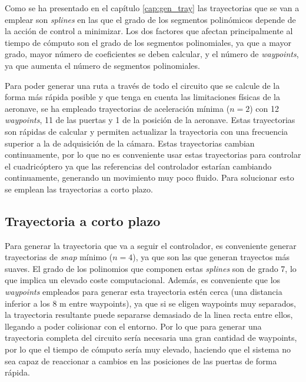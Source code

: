 Como se ha presentado en el capítulo \ref{cap:gen_tray} las trayectorias que se van a emplear son \textit{splines} en las que el grado de los segmentos polinómicos depende de la acción de control a minimizar. Los dos factores que afectan principalmente al tiempo de cómputo son el grado de los segmentos polinomiales, ya que a mayor grado, mayor número de coeficientes se deben calcular, y el número de \textit{waypoints}, ya que aumenta el número de segmentos polinomiales.

Para poder generar una ruta a través de todo el circuito que se calcule de la forma más rápida posible y que tenga en cuenta las limitaciones físicas de la aeronave, se ha empleado trayectorias de aceleración mínima ($n = 2$) con 12 \textit{waypoints}, 11 de las puertas y 1 de la posición de la aeronave. Estas trayectorias son rápidas de calcular y permiten actualizar la trayectoria con una frecuencia superior a la de adquisición de la cámara. Estas trayectorias cambian continuamente, por lo que no es conveniente usar estas trayectorias para controlar el cuadricóptero ya que las referencias del controlador estarían cambiando continuamente, generando un movimiento muy poco fluido. Para solucionar esto se emplean las trayectorias a corto plazo.

\subsection{Trayectoria a corto plazo}

Para generar la trayectoria que va a seguir el controlador, es conveniente generar trayectorias de \textit{snap} mínimo ($n=4$), ya que son las que generan trayectos más suaves. El grado de los polinomios que componen estas \textit{splines} son de grado 7, lo que implica un elevado coste computacional. Además, es conveniente que los \textit{waypoints} empleados para generar esta trayectoria estén cerca (una distancia inferior a los 8 m entre waypoints), ya que si se eligen waypoints muy separados, la trayectoria resultante puede separarse demasiado de la linea recta entre ellos, llegando a poder colisionar con el entorno. Por lo que para generar una trayectoria completa del circuito sería necesaria una gran cantidad de waypoints, por lo que el tiempo de cómputo sería muy elevado, haciendo que el sistema no sea capaz de reaccionar a cambios en las posiciones de las puertas de forma rápida.

